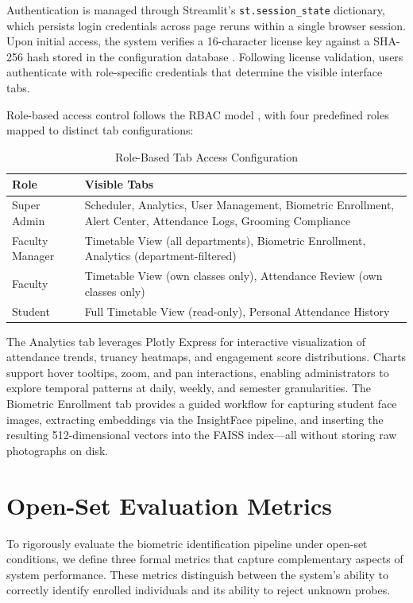 \documentclass[12pt,a4paper,oneside]{report}
\begin{document}
Authentication is managed through Streamlit's \texttt{st.session\_state} dictionary, which persists login credentials across page reruns within a single browser session. Upon initial access, the system verifies a 16-character license key against a SHA-256 hash stored in the configuration database \cite{b_auth_2016}. Following license validation, users authenticate with role-specific credentials that determine the visible interface tabs.

Role-based access control follows the RBAC model \cite{sandhu1996rbac}, with four predefined roles mapped to distinct tab configurations:

\begin{table}[htbp]
\caption{Role-Based Tab Access Configuration}
\centering
\small
{}
\setlength{\tabcolsep}{4pt}
\begin{tabular}{@{}l p{3.6in}@{}}
\hline
\textbf{Role} & \textbf{Visible Tabs} \\ \hline
Super Admin & Scheduler, Analytics, User Management, Biometric Enrollment, Alert Center, Attendance Logs, Grooming Compliance \\
Faculty Manager & Timetable View (all departments), Biometric Enrollment, Analytics (department-filtered) \\
Faculty & Timetable View (own classes only), Attendance Review (own classes only) \\
Student & Full Timetable View (read-only), Personal Attendance History \\ \hline
\end{tabular}
\label{tab:rbac_tabs}
\end{table}

The Analytics tab leverages Plotly Express for interactive visualization of attendance trends, truancy heatmaps, and engagement score distributions. Charts support hover tooltips, zoom, and pan interactions, enabling administrators to explore temporal patterns at daily, weekly, and semester granularities. The Biometric Enrollment tab provides a guided workflow for capturing student face images, extracting embeddings via the InsightFace pipeline, and inserting the resulting 512-dimensional vectors into the FAISS index---all without storing raw photographs on disk.

\section{Open-Set Evaluation Metrics}
To rigorously evaluate the biometric identification pipeline under open-set conditions, we define three formal metrics that capture complementary aspects of system performance. These metrics distinguish between the system's ability to correctly identify enrolled individuals and its ability to reject unknown probes.
\end{document}

